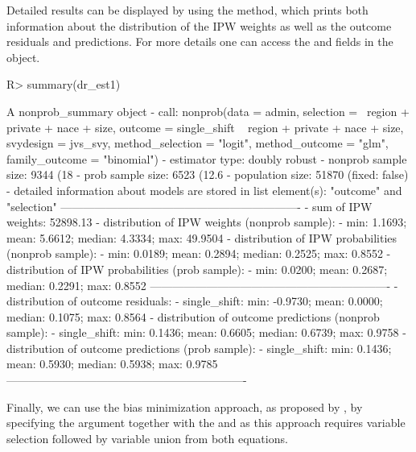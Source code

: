 \documentclass[
]{jss}
\begin{document}
Detailed results can be displayed by using the  method,
which prints both information about the distribution of the IPW weights
as well as the outcome residuals and predictions. For more details one
can access the  and  fields in the
 object.

\begin{CodeChunk}
\begin{CodeInput}
R> summary(dr_est1)
\end{CodeInput}
\begin{CodeOutput}
A nonprob_summary object
 - call: nonprob(data = admin, selection = ~region + private + nace + 
    size, outcome = single_shift ~ region + private + nace + 
    size, svydesign = jvs_svy, method_selection = "logit", 
    method_outcome = "glm", 
    family_outcome = "binomial")
 - estimator type: doubly robust
 - nonprob sample size: 9344 (18%
 - prob sample size: 6523 (12.6%
 - population size: 51870 (fixed: false)
 - detailed information about models are stored in list element(s): 
    "outcome" and "selection"
----------------------------------------------------------------
 - sum of IPW weights: 52898.13 
 - distribution of IPW weights (nonprob sample):
   - min: 1.1693; mean: 5.6612; median: 4.3334; max: 49.9504
 - distribution of IPW probabilities (nonprob sample):
   - min: 0.0189; mean: 0.2894; median: 0.2525; max: 0.8552
 - distribution of IPW probabilities (prob sample):
   - min: 0.0200; mean: 0.2687; median: 0.2291; max: 0.8552
----------------------------------------------------------------
 - distribution of outcome residuals:
   - single_shift: min: -0.9730; mean: 0.0000; median: 0.1075; max: 0.8564
 - distribution of outcome predictions (nonprob sample):
   - single_shift: min: 0.1436; mean: 0.6605; median: 0.6739; max: 0.9758
 - distribution of outcome predictions (prob sample):
   - single_shift: min: 0.1436; mean: 0.5930; median: 0.5938; max: 0.9785
----------------------------------------------------------------
\end{CodeOutput}
\end{CodeChunk}

Finally, we can use the bias minimization approach, as proposed by
\citet{yang_doubly_2020}, by specifying the
 argument
together with the  and
 as this approach requires variable
selection followed by variable union from both equations.
\end{document}
